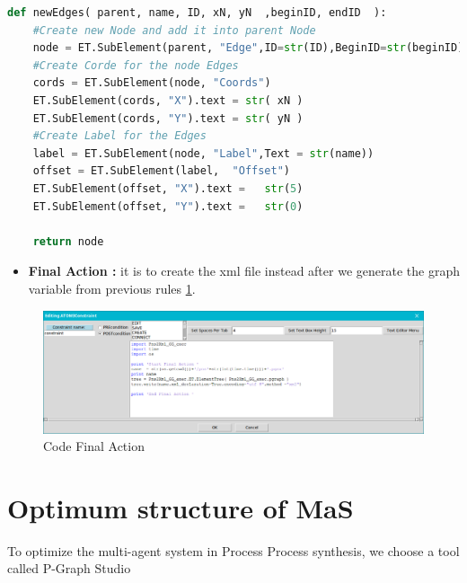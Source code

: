 \vspace{0.7cm}
\begin{lstlisting}[language=Python, caption=Python Function new Edges]
def newEdges( parent, name, ID, xN, yN  ,beginID, endID  ):
	#Create new Node and add it into parent Node	
	node = ET.SubElement(parent, "Edge",ID=str(ID),BeginID=str(beginID),EndID=str(endID),Rate=str(name),Title=str(name), ArrowOnCenter="true", ArrowPosition="50") 
	#Create Corde for the node Edges
	cords = ET.SubElement(node, "Coords")
	ET.SubElement(cords, "X").text = str( xN )
	ET.SubElement(cords, "Y").text = str( yN )
	#Create Label for the Edges
	label = ET.SubElement(node, "Label",Text = str(name))
	offset = ET.SubElement(label,  "Offset")
	ET.SubElement(offset, "X").text =   str(5)
	ET.SubElement(offset, "Y").text =   str(0)
 
	return node 
\end{lstlisting}


\pagebreak
\begin{itemize}
\item \textbf{Final Action :} it is to create the xml file instead after we generate the graph variable from previous rules \ref{fig:Code Final Action}. 
  
\end{itemize}

\begin{figure}[th]
	\centering %
 	\includegraphics[scale=0.38]{ch3/img/FinAct}
	\caption{\label{fig:Code Final Action}Code Final Action}
\end{figure}
\section{Optimum structure of MaS \label{sec:optim} }

To optimize the multi-agent system in Process Process synthesis, 
we choose a tool called P-Graph Studio 

